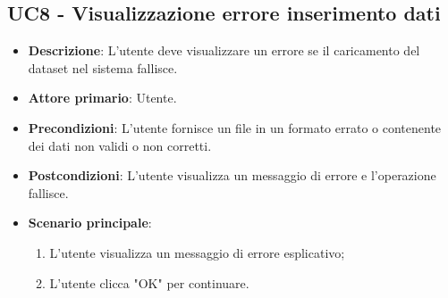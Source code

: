\subsection{UC8 - Visualizzazione errore inserimento dati}
\begin{itemize}
	\item \textbf{Descrizione}: L'utente deve visualizzare un errore se il caricamento del dataset nel sistema fallisce.
	\item \textbf{Attore primario}: Utente.
	\item \textbf{Precondizioni}: L'utente fornisce un file in un formato errato o contenente dei dati non validi o non corretti.
	\item \textbf{Postcondizioni}: L'utente visualizza un messaggio di errore e l'operazione fallisce.
	\item \textbf{Scenario principale}:
		\begin{enumerate}
			\item L'utente visualizza un messaggio di errore esplicativo;
			\item L'utente clicca "OK" per continuare.
		\end{enumerate}
\end{itemize}